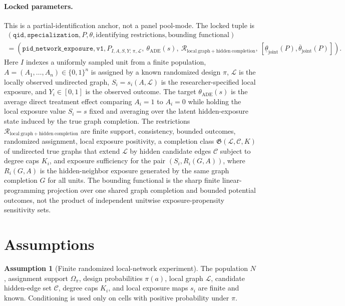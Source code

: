 \documentclass[11pt]{article}
\theoremstyle{definition}
\newtheorem{assumption}{Assumption}
\theoremstyle{plain}
\theoremstyle{remark}
\begin{document}
\paragraph{Locked parameters.}
This is a partial-identification anchor, not a panel pool-mode.  The locked tuple is
\[
\begin{gathered}
(\texttt{qid},\texttt{specialization},P,\theta,\text{identifying restrictions},
  \text{bounding functional})\\
=
(\texttt{pid\_network\_exposure},\texttt{v1},
  P_{I,A,S,Y;\,\pi,\mathcal L},\ \theta_{\mathrm{ADE}}(s),\
  \mathcal{R}_{\mathrm{local\ graph+hidden\ completion}},\
  [\underline\theta_{\mathrm{joint}}(P),\overline\theta_{\mathrm{joint}}(P)]) .
\end{gathered}
\]
Here \(I\) indexes a uniformly sampled unit from a finite population,
\(A=(A_1,\ldots,A_n)\in\{0,1\}^n\) is assigned by a known randomized design
\(\pi\), \(\mathcal L\) is the locally observed undirected graph,
\(S_i=s_i(A,\mathcal L)\) is the researcher-specified local exposure, and
\(Y_i\in[0,1]\) is the observed outcome.  The target
\(\theta_{\mathrm{ADE}}(s)\) is the average direct treatment effect comparing
\(A_i=1\) to \(A_i=0\) while holding the local exposure value \(S_i=s\) fixed
and averaging over the latent hidden-exposure state induced by the true graph
completion.  The restrictions
\(\mathcal{R}_{\mathrm{local\ graph+hidden\ completion}}\) are finite support,
consistency, bounded outcomes, randomized assignment, local exposure positivity,
a completion class \(\mathfrak G(\mathcal L,\mathcal C,K)\) of undirected true
graphs that extend \(\mathcal L\) by hidden candidate edges \(\mathcal C\)
subject to degree caps \(K_i\), and exposure sufficiency for the pair
\((S_i,R_i(G,A))\), where \(R_i(G,A)\) is the hidden-neighbor exposure generated
by the same graph completion \(G\) for all units.  The bounding functional is
the sharp finite linear-programming projection over one shared graph completion
and bounded potential outcomes, not the product of independent unitwise
exposure-propensity sensitivity sets.

\section{Assumptions}
\begin{assumption}[Finite randomized local-network experiment]\label{ass:finite-randomized}
The population \(N\), assignment support \(\Omega_\pi\), design probabilities
\(\pi(a)\), local graph \(\mathcal L\), candidate hidden-edge set
\(\mathcal C\), degree caps \(K_i\), and local exposure maps \(s_i\) are finite
and known.  Conditioning is used only on cells with positive probability under
\(\pi\).
\end{assumption}
\end{document}
